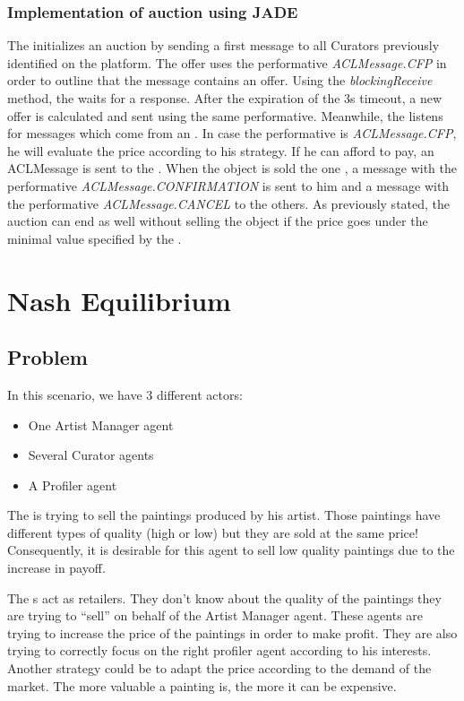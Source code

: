 \documentclass[a4paper,11pt]{article}
\begin{document}
  
  
  \subsubsection{Implementation of auction using JADE}
  
  The \am{} initializes an auction by sending a first message to all Curators previously identified 
  on the platform. The offer uses the performative \textit{ACLMessage.CFP} in order to outline that 
  the message contains an offer. Using the \textit{blockingReceive} method, the \am{} waits for a response. 
  After the expiration of the 3s timeout, a new offer is calculated and sent using the same performative. 
  Meanwhile, the \cu{} listens for messages which come from an \am{}. In case the performative is 
  \textit{ACLMessage.CFP}, he will evaluate the price according to his strategy. If he can afford to 
  pay, an ACLMessage is sent to the \am{}. When the object is sold the one \cu{}, a message with the 
  performative \textit{ACLMessage.CONFIRMATION} is sent to him and a message with the performative 
  \textit{ACLMessage.CANCEL} to the others. As previously stated, the auction can end as
  well without selling the object if the price goes under the minimal value specified by the \am{}.

  \section{Nash Equilibrium}
  
  \subsection{Problem}

  In this scenario, we have 3 different actors:
  \begin{itemize}
   \item One Artist Manager agent
   \item Several Curator agents
   \item A Profiler agent
  \end{itemize}
  
  The \am{} is trying to sell the paintings produced by his artist. Those paintings have 
  different types of quality (high or low) but they are sold at the same price! Consequently, it is desirable 
  for this agent to sell low quality paintings due to the increase in payoff.
  
  The \cu{}s act as retailers. They don't know about the quality of the paintings 
  they are trying to ``sell'' on behalf of the Artist Manager agent. These agents are 
  trying to increase the price of the paintings in order to make profit. They are also trying to 
  correctly focus on the right profiler agent according to his interests. Another strategy could 
  be to adapt the price according to the demand of the market. The more valuable a painting is, 
  the more it can be expensive.
  
\end{document}
